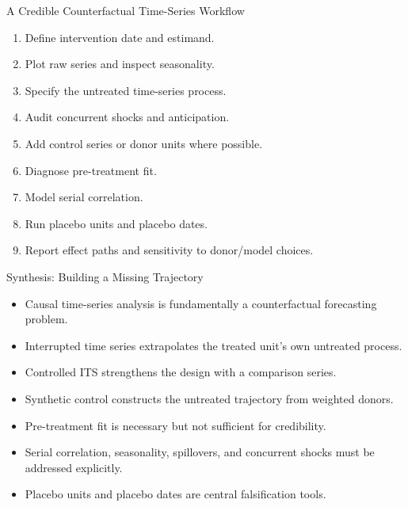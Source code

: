 \documentclass[aspectratio=169,11pt]{beamer}
\begin{document}
\begin{frame}{A Credible Counterfactual Time-Series Workflow}
\begin{enumerate}
\item Define intervention date and estimand.
\item Plot raw series and inspect seasonality.
\item Specify the untreated time-series process.
\item Audit concurrent shocks and anticipation.
\item Add control series or donor units where possible.
\item Diagnose pre-treatment fit.
\item Model serial correlation.
\item Run placebo units and placebo dates.
\item Report effect paths and sensitivity to donor/model choices.
\end{enumerate}
\end{frame}

\begin{frame}{Synthesis: Building a Missing Trajectory}
\begin{itemize}
\item Causal time-series analysis is fundamentally a counterfactual forecasting problem.
\item Interrupted time series extrapolates the treated unit's own untreated process.
\item Controlled ITS strengthens the design with a comparison series.
\item Synthetic control constructs the untreated trajectory from weighted donors.
\item Pre-treatment fit is necessary but not sufficient for credibility.
\item Serial correlation, seasonality, spillovers, and concurrent shocks must be addressed explicitly.
\item Placebo units and placebo dates are central falsification tools.
\end{itemize}
\end{frame}
\end{document}
